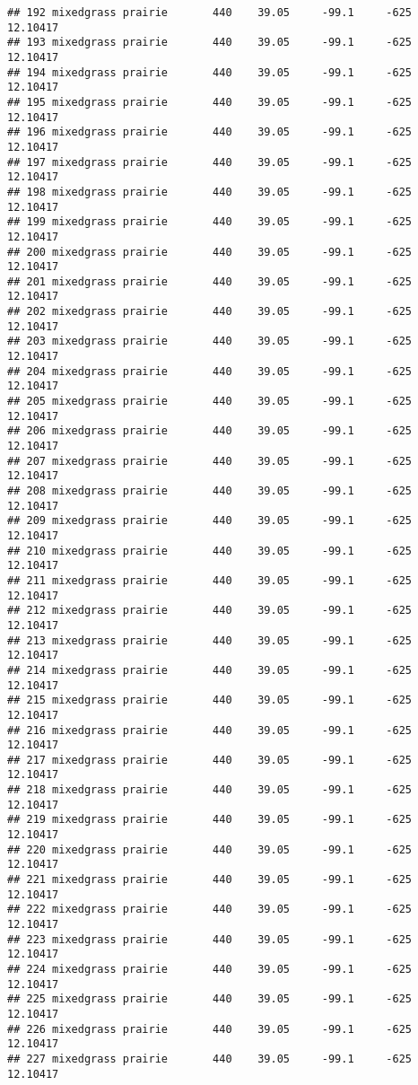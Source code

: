 \documentclass[]{article}
\begin{document}
\begin{verbatim}
## 192 mixedgrass prairie       440    39.05     -99.1     -625 12.10417
## 193 mixedgrass prairie       440    39.05     -99.1     -625 12.10417
## 194 mixedgrass prairie       440    39.05     -99.1     -625 12.10417
## 195 mixedgrass prairie       440    39.05     -99.1     -625 12.10417
## 196 mixedgrass prairie       440    39.05     -99.1     -625 12.10417
## 197 mixedgrass prairie       440    39.05     -99.1     -625 12.10417
## 198 mixedgrass prairie       440    39.05     -99.1     -625 12.10417
## 199 mixedgrass prairie       440    39.05     -99.1     -625 12.10417
## 200 mixedgrass prairie       440    39.05     -99.1     -625 12.10417
## 201 mixedgrass prairie       440    39.05     -99.1     -625 12.10417
## 202 mixedgrass prairie       440    39.05     -99.1     -625 12.10417
## 203 mixedgrass prairie       440    39.05     -99.1     -625 12.10417
## 204 mixedgrass prairie       440    39.05     -99.1     -625 12.10417
## 205 mixedgrass prairie       440    39.05     -99.1     -625 12.10417
## 206 mixedgrass prairie       440    39.05     -99.1     -625 12.10417
## 207 mixedgrass prairie       440    39.05     -99.1     -625 12.10417
## 208 mixedgrass prairie       440    39.05     -99.1     -625 12.10417
## 209 mixedgrass prairie       440    39.05     -99.1     -625 12.10417
## 210 mixedgrass prairie       440    39.05     -99.1     -625 12.10417
## 211 mixedgrass prairie       440    39.05     -99.1     -625 12.10417
## 212 mixedgrass prairie       440    39.05     -99.1     -625 12.10417
## 213 mixedgrass prairie       440    39.05     -99.1     -625 12.10417
## 214 mixedgrass prairie       440    39.05     -99.1     -625 12.10417
## 215 mixedgrass prairie       440    39.05     -99.1     -625 12.10417
## 216 mixedgrass prairie       440    39.05     -99.1     -625 12.10417
## 217 mixedgrass prairie       440    39.05     -99.1     -625 12.10417
## 218 mixedgrass prairie       440    39.05     -99.1     -625 12.10417
## 219 mixedgrass prairie       440    39.05     -99.1     -625 12.10417
## 220 mixedgrass prairie       440    39.05     -99.1     -625 12.10417
## 221 mixedgrass prairie       440    39.05     -99.1     -625 12.10417
## 222 mixedgrass prairie       440    39.05     -99.1     -625 12.10417
## 223 mixedgrass prairie       440    39.05     -99.1     -625 12.10417
## 224 mixedgrass prairie       440    39.05     -99.1     -625 12.10417
## 225 mixedgrass prairie       440    39.05     -99.1     -625 12.10417
## 226 mixedgrass prairie       440    39.05     -99.1     -625 12.10417
## 227 mixedgrass prairie       440    39.05     -99.1     -625 12.10417

\end{verbatim}
\end{document}
